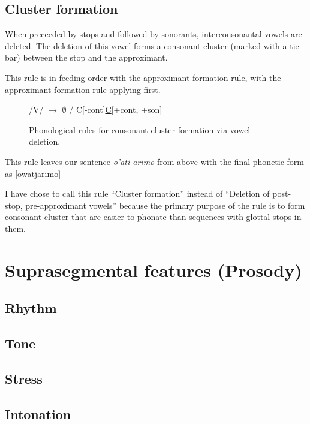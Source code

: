  	\subsection{Cluster formation}
 		When preceeded by stops and followed by sonorants, interconsonantal vowels are deleted. The deletion of this vowel forms a consonant cluster (marked with a tie bar) between the stop and the approximant.

 		This rule is in feeding order with the approximant formation rule, with the approximant formation rule applying first.

 		\begin{figure}[H]
		\label{cluster_form}
		\centering
		/V/ $\longrightarrow$ $\emptyset$ / C[-cont]\uline C[+cont, +son]

		\caption{Phonological rules for consonant cluster formation via vowel deletion.}
		\end{figure}

		This rule leaves our sentence \emph{o'ati arimo} from above with the final phonetic form as [owatjarimo]

		I have chose to call this rule ``Cluster formation'' instead of ``Deletion of post-stop, pre-approximant vowels'' because the primary purpose of the rule is to form consonant cluster that are easier to phonate than sequences with glottal stops in them.

\section{Suprasegmental features (Prosody)}
	\subsection{Rhythm}
	\subsection{Tone}
	\subsection{Stress}
	\subsection{Intonation}


